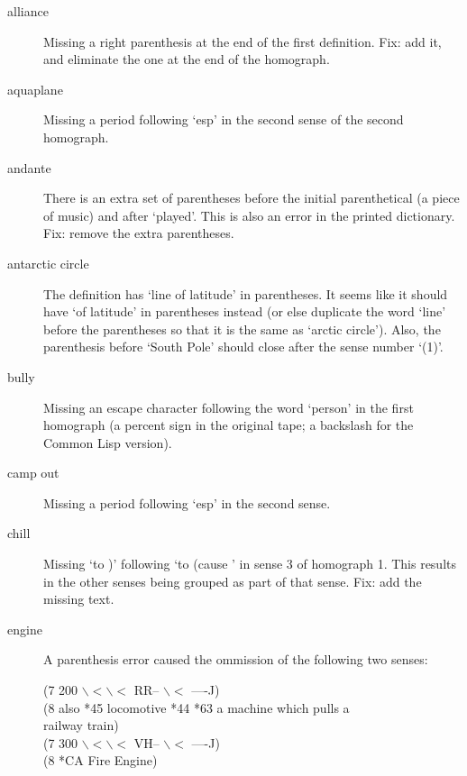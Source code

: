 \begin{description}

\item [alliance] Missing a right parenthesis at the end of the first definition.
                 Fix: add it, and eliminate the one at the end of the homograph.

\item [aquaplane] Missing a period following `esp' in the second sense of
                 the second homograph.

\item [andante] There is an extra set of parentheses before the initial parenthetical
                (a piece of music) and after `played'.  This is also an error in the
                printed dictionary.  Fix: remove the extra parentheses.

\item [antarctic circle] The definition has `line of latitude' in parentheses.  It
                seems like it should have `of latitude' in parentheses instead 
                (or else duplicate the word `line' before the parentheses so that
                 it is the same as `arctic circle').  Also, the parenthesis before
                 `South Pole' should close after the sense number `(1)'.


\item [bully]  Missing an escape character following the word `person' in the first homograph
      (a percent sign in the original tape; a backslash for the Common Lisp version).

\item [camp out] Missing a period following `esp' in the second sense.

\item [chill] Missing `to )' following `to (cause ' in sense 3 of homograph 1.
              This results in the other senses being grouped as part of that sense.
              Fix: add the missing text.


\item [engine] A parenthesis error caused the ommission of the following two senses:

\indent
(7 200 $\backslash< \backslash<$ RR-- $\backslash<$ ----J) \\
\indent
(8 also *45 locomotive *44 *63 a machine which pulls a \\
\indent
railway train) \\
\indent
(7 300 $\backslash< \backslash<$ VH-- $\backslash<$ ----J) \\
\indent
(8 *CA Fire Engine)




\end{description}
